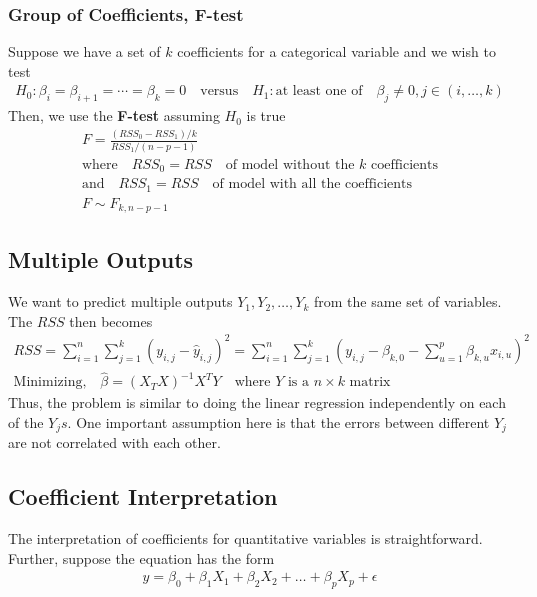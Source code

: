 \documentclass[../statistical_learning_notes.tex]{subfiles}
\begin{document}
\subsubsection{Group of Coefficients, F-test}
Suppose we have a set of $k$ coefficients for a categorical variable and we wish to test
\begin{align*}
     H_{0}: \beta_{i} = \beta_{i+1} = \cdots = \beta_{k} = 0 \quad \text{versus} \quad H_{1}: \text{at least one of} \quad \beta_{j} \neq 0, j \in (i, \ldots, k)
\end{align*}
Then, we use the \textbf{F-test} assuming $H_{0}$ is true
\begin{gather*}
    F = \frac{(RSS_{0} - RSS_{1})/k}{RSS_{1}/(n-p-1)}\\
    \text{where} \quad RSS_{0} = RSS \quad \text{of model without the $k$ coefficients}\\
    \text{and} \quad RSS_{1} = RSS \quad \text{of model with all the coefficients}\\
    F \sim F_{k, n - p - 1}
\end{gather*}

\subsection{Multiple Outputs}
We want to predict multiple outputs $Y_{1}, Y_{2}, \ldots, Y_{k}$ from the same set of variables. The $RSS$ then becomes
\begin{gather*}
    RSS = \sum_{i=1}^{n} \sum_{j=1}^{k} (y_{i,j} - \hat{y}_{i,j})^{2} = \sum_{i=1}^{n} \sum_{j=1}^{k} (y_{i,j} - \beta_{k,0} - \sum_{u=1}^{p} \beta_{k,u}x_{i,u})^{2}\\
    \text{Minimizing,} \quad \hat{\beta} = (X_{T}X)^{-1}X^{T}Y \quad \text{where $Y$ is a $n \times k$ matrix}
\end{gather*}
Thus, the problem is similar to doing the linear regression independently on each of the $Y_{j}s$. One important assumption here is that the errors between different $Y_{j}$ are not correlated with each other.


\subsection{Coefficient Interpretation}
The interpretation of coefficients for quantitative variables is straightforward. Further, suppose the equation has the form
\begin{align*}
    y = \beta_{0} + \beta_{1}X_{1} + \beta_{2}X_{2} + \ldots + \beta_{p}X_{p} + \epsilon
\end{align*}
\end{document}
